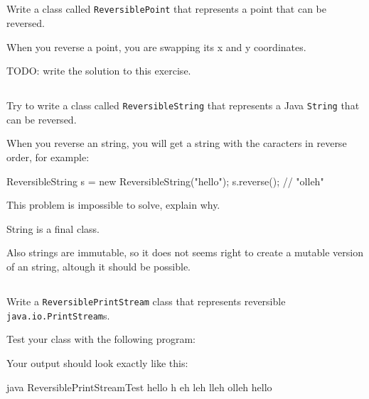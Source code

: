 \documentclass[a4paper, 11pt]{article}
\begin{document}
\subsection{}

Write a class called \texttt{ReversiblePoint} that represents a point that can
be reversed.

When you reverse a point, you are swapping its x and y coordinates.

\begin{solution}
TODO: write the solution to this exercise.
\end{solution}

\subsection{}

Try to write a class called \texttt{ReversibleString} that represents a Java
\texttt{String} that can be reversed.

When you reverse an string, you will get a string with the caracters in reverse
order, for example:

\begin{blackboard}
ReversibleString s = new ReversibleString("hello");
s.reverse(); // "olleh"
\end{blackboard}

This problem is impossible to solve, explain why.

\begin{solution}
String is a final class.

Also strings are immutable, so it does not seems right to create a mutable version
of an string, altough it should be possible.
\end{solution}

\subsection{}

Write a \texttt{ReversiblePrintStream} class that represents reversible \texttt{java.io.PrintStream}s.

Test your class with the following program:


Your output should look exactly like this:

\begin{cmd}
 java ReversiblePrintStreamTest
 hello
 h
 eh
 leh
 lleh
 olleh
 hello
 \end{cmd}
\end{document}

